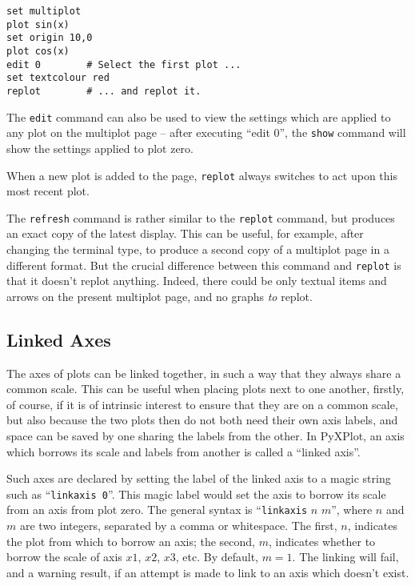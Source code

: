\begin{verbatim} 
set multiplot
plot sin(x)
set origin 10,0
plot cos(x)
edit 0        # Select the first plot ...
set textcolour red
replot        # ... and replot it.
\end{verbatim}

The \texttt{edit} command can also be used to view the settings which are
applied to any plot on the multiplot page -- after executing ``edit 0'', the
\texttt{show} command will show the settings applied to plot zero.

When a new plot is added to the page, \texttt{replot} always switches to act
upon this most recent plot.

 The \texttt{refresh} command is
rather similar to the \texttt{replot} command, but produces an exact copy of
the latest display. This can be useful, for example, after changing the
terminal type, to produce a second copy of a multiplot page in a different
format. But the crucial difference between this command and \texttt{replot} is
that it doesn't replot anything. Indeed, there could be only textual items and
arrows on the present multiplot page, and no graphs \textit{to} replot.

\subsection{Linked Axes}

The axes of plots can be linked together, in such a way that they always share
a common scale. This can be useful when placing plots next to one another,
firstly, of course, if it is of intrinsic interest to ensure that they are on a
common scale, but also because the two plots then do not both need their own
axis labels, and space can be saved by one sharing the labels from the other.
In PyXPlot, an axis which borrows its scale and labels from another is called a
``linked axis''.

Such axes are declared by setting the label of the linked axis to a magic
string such as ``\texttt{linkaxis 0}''\label{linked_axes}. This magic label would set the axis to borrow
its scale from an axis from plot zero. The general syntax is
``\texttt{linkaxis} $n$ $m$'', where $n$ and $m$ are two integers, separated by
a comma or whitespace. The first, $n$, indicates the plot from which to borrow
an axis; the second, $m$, indicates whether to borrow the scale of axis $x1$,
$x2$, $x3$, etc. By default, $m=1$. The linking will fail, and a warning
result, if an attempt is made to link to an axis which doesn't exist.

